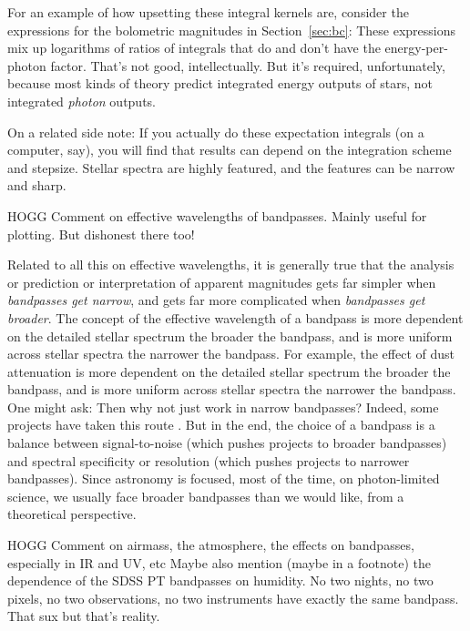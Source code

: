 \documentclass[10pt]{article}
\newcommand{\sectionname}{Section}
\newcommand{\secref}[1]{\sectionname~\ref{#1}}
\begin{document}
For an example of how upsetting these integral kernels are, consider the expressions for the bolometric magnitudes in \secref{sec:bc}:
These expressions mix up logarithms of ratios of integrals that do and don't have the energy-per-photon factor.
That's not good, intellectually.
But it's required, unfortunately, because most kinds of theory predict integrated energy outputs of stars, not integrated \emph{photon} outputs.

On a related side note:
If you actually do these expectation integrals (on a computer, say), you will find that results can depend on the integration scheme and stepsize.
Stellar spectra are highly featured, and the features can be narrow and sharp.

HOGG Comment on effective wavelengths of bandpasses. Mainly useful for plotting. But dishonest there too!

Related to all this on effective wavelengths, it is generally true that the analysis or prediction or interpretation of apparent magnitudes gets far simpler when \emph{bandpasses get narrow}, and gets far more complicated when \emph{bandpasses get broader}.
The concept of the effective wavelength of a bandpass is more dependent on the detailed stellar spectrum the broader the bandpass, and is more uniform across stellar spectra the narrower the bandpass.
For example, the effect of dust attenuation is more dependent on the detailed stellar spectrum the broader the bandpass, and is more uniform across stellar spectra the narrower the bandpass.
One might ask: Then why not just work in narrow bandpasses?
Indeed, some projects have taken this route \cite{combo17}.
But in the end, the choice of a bandpass is a balance between signal-to-noise (which pushes projects to broader bandpasses) and spectral specificity or resolution (which pushes projects to narrower bandpasses).
Since astronomy is focused, most of the time, on photon-limited science, we usually face broader bandpasses than we would like, from a theoretical perspective.

HOGG Comment on airmass, the atmosphere, the effects on bandpasses, especially in IR and UV, etc
Maybe also mention (maybe in a footnote) the dependence of the SDSS PT bandpasses on humidity.
No two nights, no two pixels, no two observations, no two instruments have exactly the same bandpass. That sux but that's reality.
\end{document}
